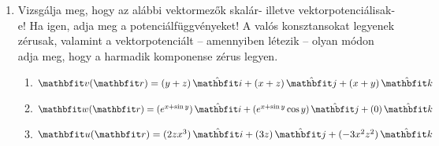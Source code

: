 \documentclass{szb-practice}
\begin{document}
\begin{enumerate}
  \item Vizsgálja meg, hogy az alábbi vektormezők skalár- illetve
        vektorpotenciálisak-e! Ha igen, adja meg a potenciálfüggvényeket!
        A valós konsztansokat legyenek zérusak, valamint a vektorpotenciált --
        amennyiben létezik -- olyan módon adja meg, hogy a harmadik komponense
        zérus legyen.
        \begin{enumerate}
          \item $\rvec v(\coordvec) = \ijk{y + z}{x + z}{x + y}$
          \item $\rvec w(\coordvec) = \ijk{e^{x + \sin y}}{e^{x + \sin y} \cos y}{0}$
          \item $\rvec u(\coordvec) = \ijk{2zx^3}{3z}{-3x^2z^2}$
        \end{enumerate}
\end{enumerate}
\end{document}
